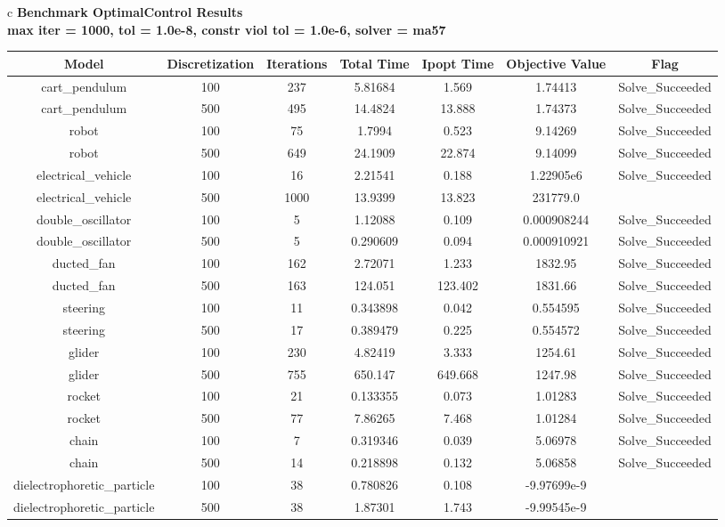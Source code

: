 \documentclass{standalone}
\begin{document}
\begin{tabular}{c}
\Large\textbf{Benchmark OptimalControl Results}\\
\large\textbf{max iter = 1000, tol = 1.0e-8, constr viol tol = 1.0e-6, solver = ma57}\\
\begin{tabular}{ccccccc}
  \hline
  \textbf{Model} & \textbf{Discretization} & \textbf{Iterations} & \textbf{Total Time} & \textbf{Ipopt Time} & \textbf{Objective Value} & \textbf{Flag} \\\hline
  cart\_pendulum & 100 & 237 & 5.81684 & 1.569 & 1.74413 & Solve\_Succeeded \\
  cart\_pendulum & 500 & 495 & 14.4824 & 13.888 & 1.74373 & Solve\_Succeeded \\
  robot & 100 & 75 & 1.7994 & 0.523 & 9.14269 & Solve\_Succeeded \\
  robot & 500 & 649 & 24.1909 & 22.874 & 9.14099 & Solve\_Succeeded \\
  electrical\_vehicle & 100 & 16 & 2.21541 & 0.188 & 1.22905e6 & Solve\_Succeeded \\
  electrical\_vehicle & 500 & 1000 & 13.9399 & 13.823 & 231779.0 & \color{red}{Maximum\_Iterations\_Exceeded} \\
  double\_oscillator & 100 & 5 & 1.12088 & 0.109 & 0.000908244 & Solve\_Succeeded \\
  double\_oscillator & 500 & 5 & 0.290609 & 0.094 & 0.000910921 & Solve\_Succeeded \\
  ducted\_fan & 100 & 162 & 2.72071 & 1.233 & 1832.95 & Solve\_Succeeded \\
  ducted\_fan & 500 & 163 & 124.051 & 123.402 & 1831.66 & Solve\_Succeeded \\
  steering & 100 & 11 & 0.343898 & 0.042 & 0.554595 & Solve\_Succeeded \\
  steering & 500 & 17 & 0.389479 & 0.225 & 0.554572 & Solve\_Succeeded \\
  glider & 100 & 230 & 4.82419 & 3.333 & 1254.61 & Solve\_Succeeded \\
  glider & 500 & 755 & 650.147 & 649.668 & 1247.98 & Solve\_Succeeded \\
  rocket & 100 & 21 & 0.133355 & 0.073 & 1.01283 & Solve\_Succeeded \\
  rocket & 500 & 77 & 7.86265 & 7.468 & 1.01284 & Solve\_Succeeded \\
  chain & 100 & 7 & 0.319346 & 0.039 & 5.06978 & Solve\_Succeeded \\
  chain & 500 & 14 & 0.218898 & 0.132 & 5.06858 & Solve\_Succeeded \\
  dielectrophoretic\_particle & 100 & 38 & 0.780826 & 0.108 & -9.97699e-9 & \color{red}{Infeasible\_Problem\_Detected} \\
  dielectrophoretic\_particle & 500 & 38 & 1.87301 & 1.743 & -9.99545e-9 & \color{red}{Infeasible\_Problem\_Detected} \\\hline
\end{tabular}
\end{tabular}
\end{document}
